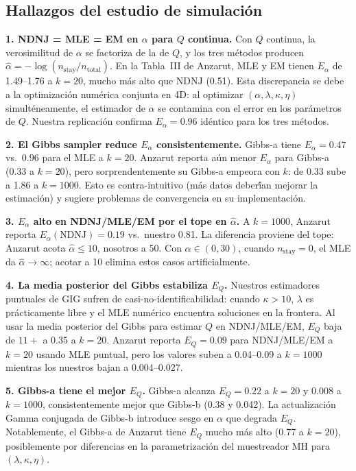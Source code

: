 \documentclass[12pt,letterpaper]{article}
\begin{document}
\subsection{Hallazgos del estudio de simulaci\'{o}n}

\textbf{1. NDNJ = MLE = EM en $\alpha$ para $Q$ continua.}
Con $Q$ continua, la verosimilitud de $\alpha$ se factoriza de la de $Q$, y los tres m\'{e}todos producen $\hat{\alpha} = -\log(n_{\text{stay}}/n_{\text{total}})$. En la Tabla~III de Anzarut, MLE y EM tienen $E_\alpha$ de 1.49--1.76 a $k=20$, mucho m\'{a}s alto que NDNJ (0.51). Esta discrepancia se debe a la optimizaci\'{o}n num\'{e}rica conjunta en 4D: al optimizar $(\alpha, \lambda, \kappa, \eta)$ simult\'{e}neamente, el estimador de $\alpha$ se contamina con el error en los par\'{a}metros de $Q$. Nuestra replicaci\'{o}n confirma $E_\alpha = 0.96$ id\'{e}ntico para los tres m\'{e}todos.

\textbf{2. El Gibbs sampler reduce $E_\alpha$ consistentemente.}
Gibbs-a tiene $E_\alpha = 0.47$ vs.\ $0.96$ para el MLE a $k=20$. Anzarut reporta a\'{u}n menor $E_\alpha$ para Gibbs-a (0.33 a $k=20$), pero sorprendentemente su Gibbs-a empeora con $k$: de 0.33 sube a 1.86 a $k=1000$. Esto es contra-intuitivo (m\'{a}s datos deber\'{\'i}an mejorar la estimaci\'{o}n) y sugiere problemas de convergencia en su implementaci\'{o}n.

\textbf{3. $E_\alpha$ alto en NDNJ/MLE/EM por el tope en $\hat{\alpha}$.}
A $k=1000$, Anzarut reporta $E_\alpha(\text{NDNJ}) = 0.19$ vs.\ nuestro 0.81. La diferencia proviene del tope: Anzarut acota $\hat{\alpha} \leq 10$, nosotros a 50. Con $\alpha \in (0,30)$, cuando $n_{\text{stay}} = 0$, el MLE da $\hat{\alpha} \to \infty$; acotar a 10 elimina estos casos artificialmente.

\textbf{4. La media posterior del Gibbs estabiliza $E_Q$.}
Nuestros estimadores puntuales de GIG sufren de casi-no-identificabilidad: cuando $\kappa > 10$, $\lambda$ es pr\'{a}cticamente libre y el MLE num\'{e}rico encuentra soluciones en la frontera. Al usar la media posterior del Gibbs para estimar $Q$ en NDNJ/MLE/EM, $E_Q$ baja de $11+$ a 0.35 a $k=20$. Anzarut reporta $E_Q = 0.09$ para NDNJ/MLE/EM a $k=20$ usando MLE puntual, pero los valores suben a 0.04--0.09 a $k=1000$ mientras los nuestros bajan a 0.004--0.027.

\textbf{5. Gibbs-a tiene el mejor $E_Q$.}
Gibbs-a alcanza $E_Q = 0.22$ a $k=20$ y $0.008$ a $k=1000$, consistentemente mejor que Gibbs-b (0.38 y 0.042). La actualizaci\'{o}n Gamma conjugada de Gibbs-b introduce sesgo en $\alpha$ que degrada $E_Q$. Notablemente, el Gibbs-a de Anzarut tiene $E_Q$ mucho m\'{a}s alto (0.77 a $k=20$), posiblemente por diferencias en la parametrizaci\'{o}n del muestreador MH para $(\lambda, \kappa, \eta)$.
\end{document}
